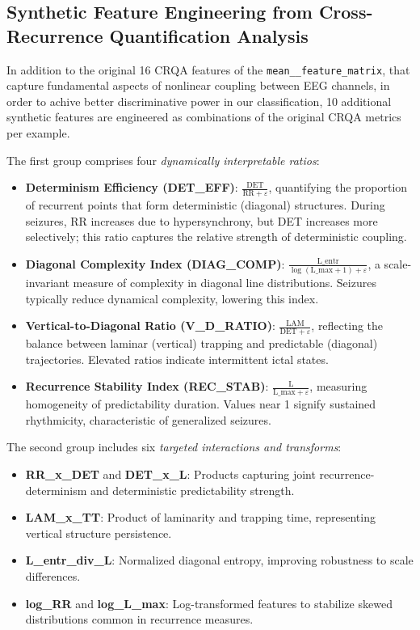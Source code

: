 \documentclass{article}
\begin{document}
				\subsection{Synthetic Feature Engineering from Cross-Recurrence Quantification Analysis}
				\label{subsec:synthetic_features}

				In addition to the original 16 CRQA features of the \texttt{mean\_\_feature\_matrix}, that capture 
				fundamental aspects of nonlinear coupling between EEG channels, in order to achive 
				better discriminative power in our classification,
				10 additional synthetic features are engineered as combinations of the original CRQA metrics per example.

				The first group comprises four \textit{dynamically interpretable ratios}:
				\begin{itemize}
				\item \textbf{Determinism Efficiency (DET\_EFF)}: $\frac{\text{DET}}{\text{RR} + \varepsilon}$, quantifying the proportion of recurrent points that form deterministic (diagonal) structures. During seizures, RR increases due to hypersynchrony, but DET increases more selectively; this ratio captures the relative strength of deterministic coupling.
				    \item \textbf{Diagonal Complexity Index (DIAG\_COMP)}: $\frac{\text{L\_entr}}{\log(\text{L\_max} + 1) + \varepsilon}$, a scale-invariant measure of complexity in diagonal line distributions. Seizures typically reduce dynamical complexity, lowering this index.
				    \item \textbf{Vertical-to-Diagonal Ratio (V\_D\_RATIO)}: $\frac{\text{LAM}}{\text{DET} + \varepsilon}$, reflecting the balance between laminar (vertical) trapping and predictable (diagonal) trajectories. Elevated ratios indicate intermittent ictal states.
				    \item \textbf{Recurrence Stability Index (REC\_STAB)}: $\frac{\text{L}}{\text{L\_max} + \varepsilon}$, measuring homogeneity of predictability duration. Values near 1 signify sustained rhythmicity, characteristic of generalized seizures.

				\end{itemize}

				The second group includes six \textit{targeted interactions and transforms}:
				\begin{itemize}
				\item \textbf{RR\_x\_DET} and \textbf{DET\_x\_L}: Products capturing joint recurrence-determinism and deterministic predictability strength.
				    \item \textbf{LAM\_x\_TT}: Product of laminarity and trapping time, representing vertical structure persistence.
				    \item \textbf{L\_entr\_div\_L}: Normalized diagonal entropy, improving robustness to scale differences.
				    \item \textbf{log\_RR} and \textbf{log\_L\_max}: Log-transformed features to stabilize skewed distributions common in recurrence measures.

				\end{itemize}
\end{document}
